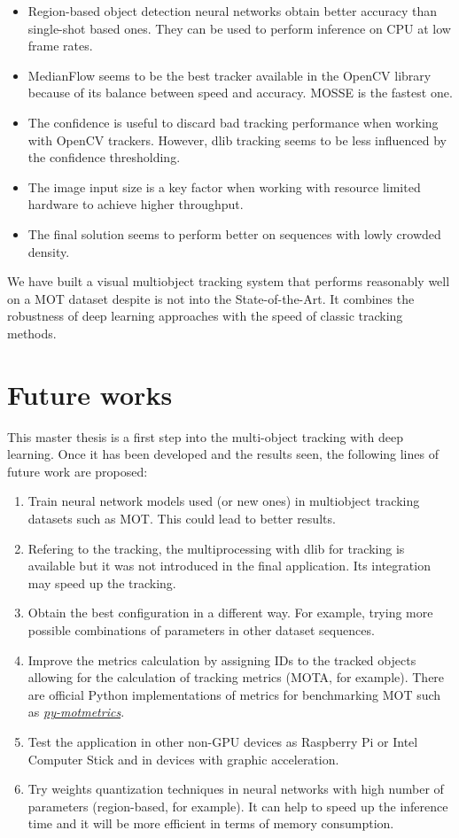 \begin{itemize}
    \item Region-based object detection neural networks obtain better accuracy than single-shot based ones. They can be used to perform inference on CPU at low frame rates.
    \item MedianFlow seems to be the best tracker available in the OpenCV library because of its balance between speed and accuracy. MOSSE is the fastest one.
    \item The confidence is useful to discard bad tracking performance when working with OpenCV trackers. However, dlib tracking seems to be less influenced by the confidence thresholding.
    \item The image input size is a key factor when working with resource limited hardware to achieve higher throughput.
    \item The final solution seems to perform better on sequences with lowly crowded density.
\end{itemize}
We have built a visual multiobject tracking system that performs reasonably well on a MOT dataset despite is not into the State-of-the-Art. It combines the robustness of deep learning approaches with the speed of classic tracking methods.
\section{Future works}
This master thesis is a first step into the multi-object tracking with deep learning. Once it has been developed and the results seen, the following lines of future work are proposed:
\begin{enumerate}
    \item Train neural network models used (or new ones) in multiobject tracking datasets such as MOT. This could lead to better results.
    \item Refering to the tracking, the multiprocessing with dlib for tracking is available but it was not introduced in the final application. Its integration may speed up the tracking.
    \item Obtain the best configuration in a different way. For example, trying more possible combinations of parameters in other dataset sequences.
    \item Improve the metrics calculation by assigning IDs to the tracked objects allowing for the calculation of tracking metrics (MOTA, for example). There are official Python implementations of metrics for benchmarking MOT such as \href{https://github.com/cheind/py-motmetrics}{\textit{py-motmetrics}}.
    \item Test the application in other non-GPU devices as Raspberry Pi or Intel Computer Stick and in devices with graphic acceleration.
    \item Try weights quantization techniques in neural networks with high number of parameters (region-based, for example). It can help to speed up the inference time and it will be more efficient in terms of memory consumption.
\end{enumerate}